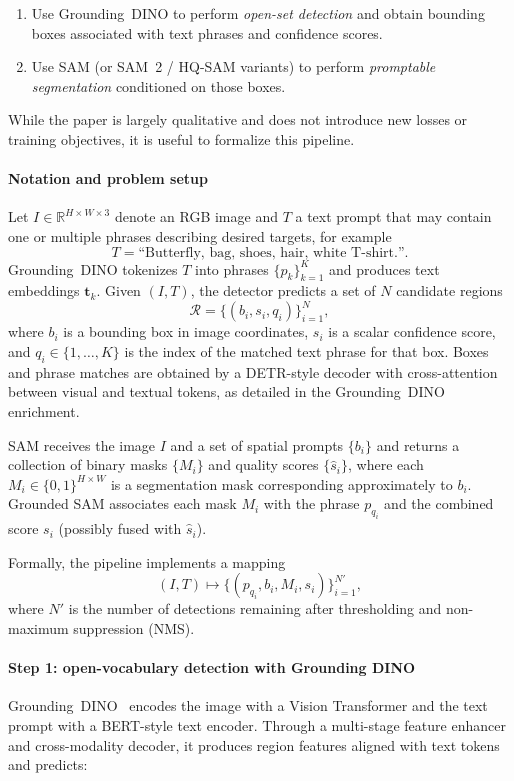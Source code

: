 \begin{enrichment}
\begin{enrichment}
		\begin{enumerate}
			\item Use Grounding~DINO to perform \emph{open-set detection} and obtain bounding boxes associated with text phrases and confidence scores.
			\item Use SAM (or SAM~2 / HQ-SAM variants) to perform \emph{promptable segmentation} conditioned on those boxes.
		\end{enumerate}
		
		While the paper is largely qualitative and does not introduce new losses or training objectives, it is useful to formalize this pipeline.
		
		\paragraph{Notation and problem setup}
		Let $I \in \mathbb{R}^{H \times W \times 3}$ denote an RGB image and $T$ a text prompt that may contain one or multiple phrases describing desired targets, for example
		\[
		T = \text{``Butterfly, bag, shoes, hair, white T-shirt.''}.
		\]
		Grounding~DINO tokenizes $T$ into phrases $\{p_k\}_{k=1}^K$ and produces text embeddings $\mathbf{t}_k$.
		Given $(I,T)$, the detector predicts a set of $N$ candidate regions
		\[
		\mathcal{R} = \{(b_i, s_i, q_i)\}_{i=1}^{N},
		\]
		where $b_i$ is a bounding box in image coordinates, $s_i$ is a scalar confidence score, and $q_i \in \{1,\dots,K\}$ is the index of the matched text phrase for that box.
		Boxes and phrase matches are obtained by a DETR-style decoder with cross-attention between visual and textual tokens, as detailed in the Grounding~DINO enrichment.
		
		SAM receives the image $I$ and a set of spatial prompts $\{b_i\}$ and returns a collection of binary masks $\{M_i\}$ and quality scores $\{\hat{s}_i\}$, where each $M_i \in \{0,1\}^{H \times W}$ is a segmentation mask corresponding approximately to $b_i$.
		Grounded SAM associates each mask $M_i$ with the phrase $p_{q_i}$ and the combined score $s_i$ (possibly fused with $\hat{s}_i$).
		
		Formally, the pipeline implements a mapping
		\[
		(I, T) \longmapsto \{(p_{q_i}, b_i, M_i, s_i)\}_{i=1}^{N'},
		\]
		where $N'$ is the number of detections remaining after thresholding and non-maximum suppression (NMS).
		
		\paragraph{Step 1: open-vocabulary detection with Grounding DINO}
		Grounding~DINO~\cite{liu2023_groundingdino} encodes the image with a Vision Transformer and the text prompt with a BERT-style text encoder.
		Through a multi-stage feature enhancer and cross-modality decoder, it produces region features aligned with text tokens and predicts:
		

\end{enrichment}
\end{enrichment}
